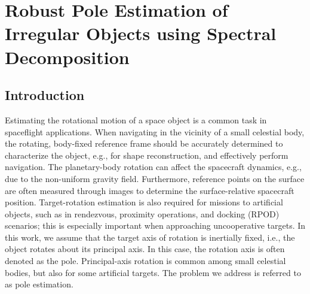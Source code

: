 




\chapter{Robust Pole Estimation of Irregular Objects using Spectral Decomposition}
\label{chapter:FPE}





\section{Introduction}

Estimating the rotational motion of a space object is a common task in spaceflight applications. When navigating in the vicinity of a small celestial body, the rotating, body-fixed reference frame should be accurately determined to characterize the object, e.g., for shape reconstruction, and effectively perform navigation. The planetary-body rotation can affect the spacecraft dynamics, e.g., due to the non-uniform gravity field. Furthermore, reference points on the surface are often measured through images to determine the surface-relative spacecraft position. Target-rotation estimation is also required for missions to artificial objects, such as in rendezvous, proximity operations, and docking (RPOD) scenarios; this is especially important when approaching uncooperative targets. In this work, we assume that the target axis of rotation is inertially fixed, i.e., the object rotates about its principal axis. In this case, the rotation axis is often denoted as the pole. Principal-axis rotation is common among small celestial bodies, but also for some artificial targets. The problem we address is referred to as pole estimation.

